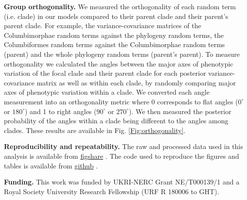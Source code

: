 \documentclass[12pt,letterpaper]{article}
\begin{document}
\textbf{Group orthogonality.}
We measured the orthogonality of each random term (i.e. clade) in our models compared to their parent clade and their parent's parent clade.
For example, the variance-covariance matrices of the Columbimorphae random terms against the phylogeny random terms, the Columbiformes random terms against the Columbimorphae random terms (parent) and the whole phylogeny random terms (parent's parent).
To measure orthogonality we calculated the angles between the major axes of phenotypic variation of the focal clade and their parent clade for each posterior variance-covariance matrix as well as within each clade, by randomly comparing major axes of phenotypic variation within a clade.
We converted each angle measurement into an orthogonality metric where 0 corresponds to flat angles ($0^\circ$ or  $180^\circ$) and 1 to right angles ($90^\circ$ or $270^\circ$).
We then measured the posterior probability of the angles within a clade being different to the angles among clades.
These results are available in Fig. \ref{Fig:orthogonality}.

\textbf{Reproducibility and repeatability.}
The raw and processed data used in this analysis is available from \href{https://figshare.com/articles/dataset/Innovation_and_elaboration_on_the_avian_tree_of_life/20480355}{figshare} \cite{fighsaredata}.
The code used to reproduce the figures and tables is available from \href{https://github.com/TGuillerme/elaboration_exploration_bird_beaks}{github} \cite{githubrepo}.

\textbf{Funding.}
This work was funded by UKRI-NERC Grant NE/T000139/1 and a Royal Society University Research Fellowship (URF R 180006 to GHT).




\end{document}
